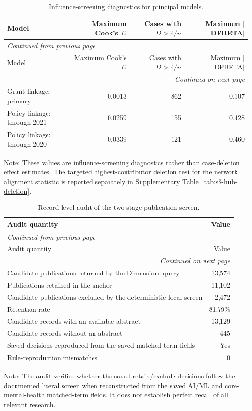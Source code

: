 \documentclass[11pt]{article}
\begin{document}
\begin{longtable}{p{5.0cm}rrr}
\caption{Influence-screening diagnostics for principal models.}\label{tab:s12-influence}\\
\toprule
Model & Maximum Cook's $D$ & Cases with $D>4/n$ & Maximum $|$DFBETA$|$ \\
\midrule
\endfirsthead
\multicolumn{4}{l}{\small\itshape Continued from previous page} \\
\toprule
Model & Maximum Cook's $D$ & Cases with $D>4/n$ & Maximum $|$DFBETA$|$ \\
\midrule
\endhead
\midrule
\multicolumn{4}{r}{\small\itshape Continued on next page} \\
\endfoot
\bottomrule
\endlastfoot
Grant linkage: primary & 0.0013 & 862 & 0.107 \\
Policy linkage: through 2021 & 0.0259 & 155 & 0.428 \\
Policy linkage: through 2020 & 0.0339 & 121 & 0.460 \\
\end{longtable}

\noindent\small Note: These values are influence-screening diagnostics rather than case-deletion effect estimates. The targeted highest-contributor deletion test for the network alignment statistic is reported separately in Supplementary Table~\ref{tab:s8-hub-deletion}.

\begin{longtable}{p{8.2cm}r}
\caption{Record-level audit of the two-stage publication screen.}\label{tab:s13-screening-audit}\\
\toprule
Audit quantity & Value \\
\midrule
\endfirsthead
\multicolumn{2}{l}{\small\itshape Continued from previous page} \\
\toprule
Audit quantity & Value \\
\midrule
\endhead
\midrule
\multicolumn{2}{r}{\small\itshape Continued on next page} \\
\endfoot
\bottomrule
\endlastfoot
Candidate publications returned by the Dimensions query & 13,574 \\
Publications retained in the anchor & 11,102 \\
Candidate publications excluded by the deterministic local screen & 2,472 \\
Retention rate & 81.79\% \\
Candidate records with an available abstract & 13,129 \\
Candidate records without an abstract & 445 \\
Saved decisions reproduced from the saved matched-term fields & Yes \\
Rule-reproduction mismatches & 0 \\
\end{longtable}

\noindent\small Note: The audit verifies whether the saved retain/exclude decisions follow the documented literal screen when reconstructed from the saved AI/ML and core-mental-health matched-term fields. It does not establish perfect recall of all relevant research.
\end{document}
